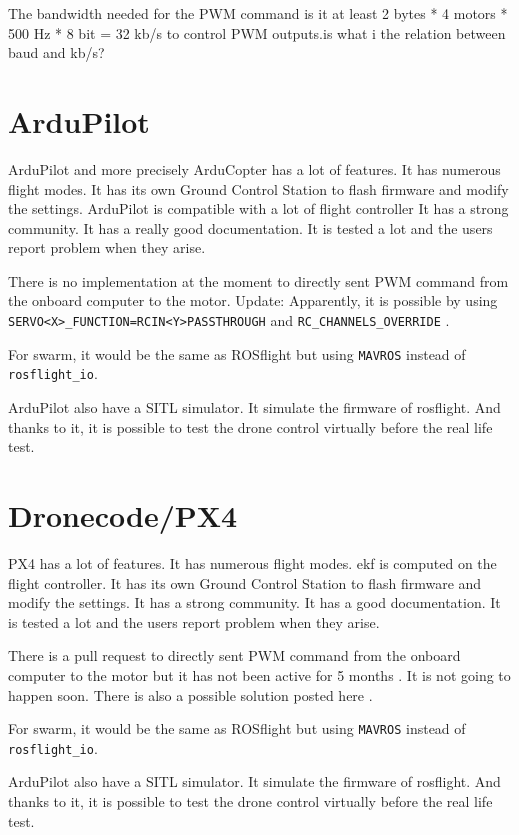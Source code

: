 The bandwidth needed for the PWM command is it at least
2 bytes * 4 motors * 500 Hz * 8 bit = 32 kb/s to control PWM outputs.{\color{red}is what i the relation between baud and kb/s?}

\section{ArduPilot}
ArduPilot and more precisely ArduCopter has a lot of features.
It has numerous flight modes.
It has its own Ground Control Station to flash firmware and modify the settings.
ArduPilot is compatible with a lot of flight controller
It has a strong community.
It has a really good documentation.
It is tested a lot and the users report problem when they arise.

There is no implementation at the moment to directly sent PWM command from the onboard computer to the motor.
{\color{blue} Update: Apparently, it is possible by using \texttt{SERVO<X>\_FUNCTION=RCIN<Y>PASSTHROUGH} and \texttt{RC\_CHANNELS\_OVERRIDE}}
\cite{github_ardupilot_11859}.

For swarm, it would be the same as ROSflight but using \texttt{MAVROS} instead of \texttt{rosflight\_io}.

ArduPilot also have a SITL simulator. It simulate the firmware of rosflight. And thanks to it, it is possible to test the drone control virtually before the real life test.

\section{Dronecode/PX4}
PX4 has a lot of features.
It has numerous flight modes.
\Gls{ekf} is computed on the flight controller.
It has its own Ground Control Station to flash firmware and modify the settings.
It has a strong community.
It has a good documentation.
It is tested a lot and the users report problem when they arise.

There is a pull request to directly sent PWM command from the onboard computer to the motor but it has not been active for 5 months \cite{github_px4_10863}. It is not going to happen soon.
There is also a possible solution posted here \cite{px4_low_level_control}.



For swarm, it would be the same as ROSflight but using \texttt{MAVROS} instead of \texttt{rosflight\_io}.

ArduPilot also have a SITL simulator. It simulate the firmware of rosflight. And thanks to it, it is possible to test the drone control virtually before the real life test.


